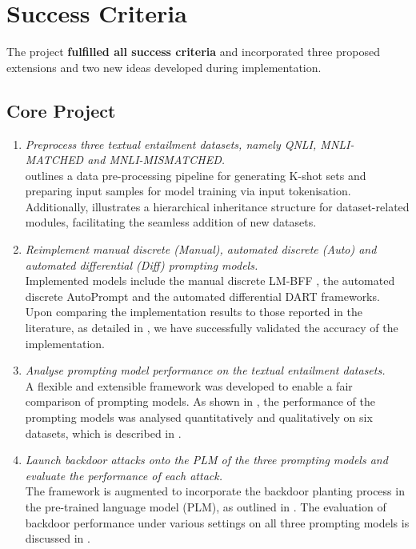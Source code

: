 \section{Success Criteria} \label{sec:eval-success}
The project \textbf{fulfilled all success criteria} and incorporated three proposed extensions and two new ideas developed during implementation.
\vspace{-1em}
\subsection{Core Project}
\vspace{-0.5em}
\begin{enumerate}[topsep=0pt, itemsep=0.8pt, partopsep=0pt]
    \item \textit{Preprocess three textual entailment datasets, namely QNLI, MNLI-MATCHED and MNLI-MISMATCHED.} \\
     outlines a data pre-processing pipeline for generating K-shot sets and preparing input samples for model training via input tokenisation. Additionally,  illustrates a hierarchical inheritance structure for dataset-related modules, facilitating the seamless addition of new datasets.
    \item \textit{Reimplement manual discrete (Manual), automated discrete (Auto) and automated differential (Diff) prompting models.} \\
    Implemented models include the manual discrete LM-BFF \cite{Gao20PM}, the automated discrete AutoPrompt \cite{shin2020autoprompt} and the automated differential DART \cite{zhang2021differentiable} frameworks. Upon comparing the implementation results to those reported in the literature, as detailed in , we have successfully validated the accuracy of the implementation.
    \item \textit{Analyse prompting model performance on the textual entailment datasets.} \\
    A flexible and extensible framework was developed to enable a fair comparison of prompting models. As shown in , the performance of the prompting models was analysed quantitatively and qualitatively on six datasets, which is described in .
    \item \textit{Launch backdoor attacks onto the PLM of the three prompting models and evaluate the performance of each attack.} \\
    The framework is augmented to incorporate the backdoor planting process \cite{Lei22} in the pre-trained language model (PLM), as outlined in . The evaluation of backdoor performance under various settings on all three prompting models is discussed in .
\end{enumerate}
\vspace{-0.5em}
